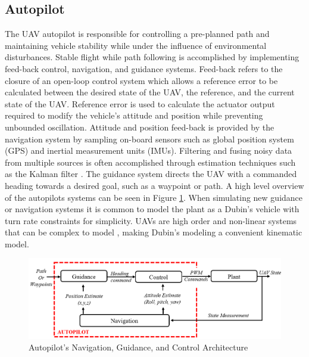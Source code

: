 \documentclass[numbered,pdftex]{ohio-etd}
\begin{document}
\subsection{Autopilot}
The UAV autopilot is responsible for controlling a pre-planned path and maintaining vehicle stability while under the influence of environmental disturbances. Stable flight while path following is accomplished by implementing feed-back control, navigation, and guidance systems. Feed-back refers to the closure of an open-loop control system which allows a reference error to be calculated between the desired state of the UAV, the reference, and the current state of the UAV. Reference error is used to calculate the actuator output required to modify the vehicle's attitude and position while preventing unbounded oscillation. Attitude and position feed-back is provided by the navigation system by sampling on-board sensors such as global position system (GPS) and inertial measurement units (IMUs). Filtering and fusing noisy data from multiple sources is often accomplished through estimation techniques such as the Kalman filter \cite{de_marina_guidance_2017}. The guidance system directs the UAV with a commanded heading towards a desired goal, such as a waypoint or path. A high level overview of the autopilots systems can be seen in Figure \ref{fig:autopilotloops}. When simulating new guidance or navigation systems it is common to model the plant as a Dubin's vehicle with turn rate constraints for simplicity. UAVs are high order and non-linear systems that can be complex to model \cite{beard_small_2012}, making Dubin's modeling a convenient kinematic model.



%
%
%




\begin{figure}[H]
	\centering
	\includegraphics[width=15cm]{PaperFigures/autopilotLoops2}
	\caption{Autopilot's Navigation, Guidance, and Control Architecture}
	\label{fig:autopilotloops}
\end{figure}
\end{document}
